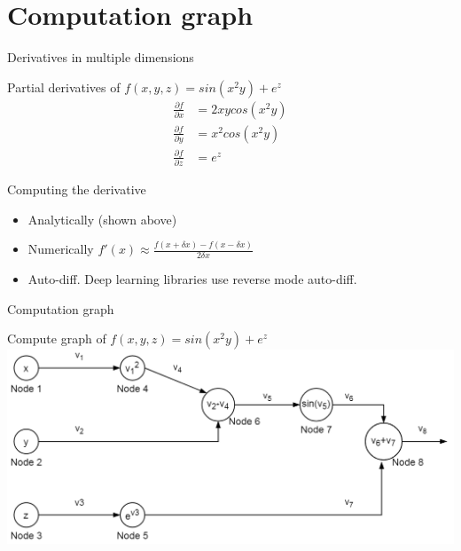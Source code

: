\section{Computation graph}
\begin{frame}{Derivatives in multiple dimensions} 
	\begin{block}{ Partial derivatives of $f(x,y,z)= sin(x^2y)+e^z$}
		\begin{align}
			\frac{\partial f}{\partial x} &= 2xycos(x^2y) \\
			\frac{\partial f}{\partial y} &= x^2cos(x^2y) \\
			\frac{\partial f}{\partial z} &= e^z 
		\end{align}
	\end{block}
	Computing the derivative
		\begin{itemize}
			\item Analytically (shown above)
			\item Numerically $f'(x) \approx \frac{f(x+\delta x) - f(x-\delta x)}{2\delta x}$
			\item Auto-diff. Deep learning libraries use reverse mode auto-diff.
		\end{itemize}
\end{frame} 

\begin{frame}{Computation graph}
	\begin{block}{ Compute graph of $f(x,y,z)= sin(x^2y)+e^z$ }
		\includegraphics[width=1.\textwidth, center]{figuras/backprop_eg1.png}
	\end{block}
\end{frame}

